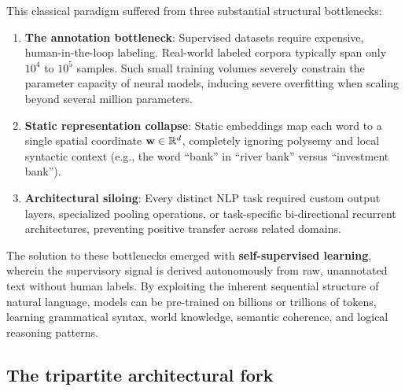 \documentclass[../../main.tex]{subfiles}
\begin{document}
This classical paradigm suffered from three substantial structural bottlenecks:
\begin{enumerate}
    \item \textbf{The annotation bottleneck}: Supervised datasets require expensive, human-in-the-loop labeling. Real-world labeled corpora typically span only $10^4$ to $10^5$ samples. Such small training volumes severely constrain the parameter capacity of neural models, inducing severe overfitting when scaling beyond several million parameters.
    \item \textbf{Static representation collapse}: Static embeddings map each word to a single spatial coordinate $\mathbf{w} \in \mathbb{R}^d$, completely ignoring polysemy and local syntactic context (e.g., the word ``bank'' in ``river bank'' versus ``investment bank'').
    \item \textbf{Architectural siloing}: Every distinct NLP task required custom output layers, specialized pooling operations, or task-specific bi-directional recurrent architectures, preventing positive transfer across related domains.
\end{enumerate}

The solution to these bottlenecks emerged with \textbf{self-supervised learning}, wherein the supervisory signal is derived autonomously from raw, unannotated text without human labels. By exploiting the inherent sequential structure of natural language, models can be pre-trained on billions or trillions of tokens, learning grammatical syntax, world knowledge, semantic coherence, and logical reasoning patterns.

\subsection{The tripartite architectural fork}
\label{subsec:architectural_fork_three_paradigms}
\end{document}
